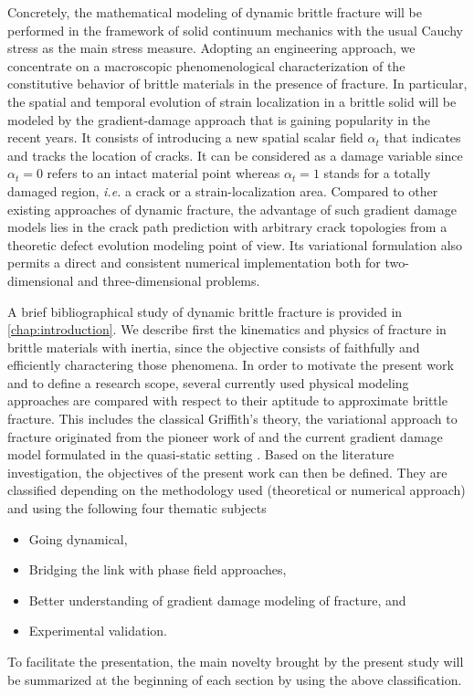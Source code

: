Concretely, the mathematical modeling of dynamic brittle fracture will be performed in the framework of solid continuum mechanics with the usual Cauchy stress as the main stress measure. Adopting an engineering approach, we concentrate on a macroscopic phenomenological characterization of the constitutive behavior of brittle materials in the presence of fracture. In particular, the spatial and temporal evolution of strain localization in a brittle solid will be modeled by the gradient-damage approach that is gaining popularity in the recent years. It consists of introducing a new spatial scalar field $\alpha_t$ that indicates and tracks the location of cracks. It can be considered as a damage variable since $\alpha_t=0$ refers to an intact material point whereas $\alpha_t=1$ stands for a totally damaged region, \emph{i.e.} a crack or a strain-localization area. Compared to other existing approaches of dynamic fracture, the advantage of such gradient damage models lies in the crack path prediction with arbitrary crack topologies from a theoretic defect evolution modeling point of view. Its variational formulation also permits a direct and consistent numerical implementation both for two-dimensional and three-dimensional problems.

A brief bibliographical study of dynamic brittle fracture is provided in \cref{chap:introduction}. We describe first the kinematics and physics of fracture in brittle materials with inertia, since the objective consists of faithfully and efficiently charactering those phenomena. In order to motivate the present work and to define a research scope, several currently used physical modeling approaches are compared with respect to their aptitude to approximate brittle fracture. This includes the classical Griffith's theory, the variational approach to fracture originated from the pioneer work of \cite{FrancfortMarigo:1998} and the current gradient damage model formulated in the quasi-static setting \cite{PhamMarigo:2010-1}. Based on the literature investigation, the objectives of the present work can then be defined. They are classified depending on the methodology used (theoretical or numerical approach) and using the following four thematic subjects
\begin{itemize}
\item Going dynamical,
\item Bridging the link with phase field approaches,
\item Better understanding of gradient damage modeling of fracture, and
\item Experimental validation.
\end{itemize}
To facilitate the presentation, the main novelty brought by the present study will be summarized at the beginning of each section by using the above classification.

